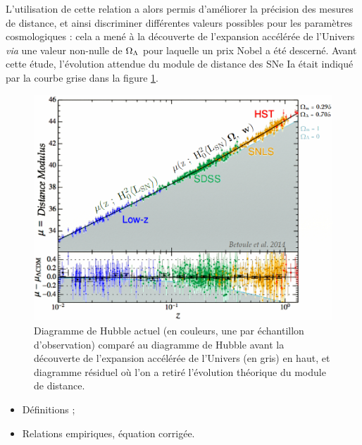 \documentclass[a4paper, 12pt, svgnames]{article}
\begin{document}
L'utilisation de cette relation a alors permis d'améliorer la précision des
mesures de distance, et ainsi discriminer différentes valeurs possibles pour les
paramètres cosmologiques : cela a mené à la découverte de l'expansion accélérée
de l'Univers \textit{via} une valeur non-nulle de $\Omega_\Lambda$ pour laquelle un prix
Nobel a été descerné. Avant cette étude, l'évolution attendue du module de
distance des SNe Ia était indiqué par la courbe grise dans la figure
\ref{hub_acc_exp}.

\begin{figure}[htbp!]
    \centering
    \includegraphics[width=.5\linewidth]{Rapport_figures/bet_al_2.PNG}
    \captionsetup{justification=centering}
    \caption{Diagramme de Hubble actuel (en couleurs, une par échantillon
             d'observation) comparé au diagramme de Hubble avant la découverte 
             de l'expansion accélérée de l'Univers (en gris) en haut, et
             diagramme résiduel où l'on a retiré l'évolution théorique du module
             de distance.}
    \label{hub_acc_exp}
\end{figure}

\begin{itemize}
    \item Définitions ;
    \item Relations empiriques, équation corrigée.
\end{itemize}
\end{document}
